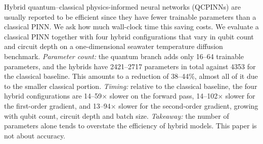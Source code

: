 Hybrid quantum--classical physics-informed neural networks (QCPINNs) are usually reported to be
efficient since they have fewer trainable parameters than a classical PINN. We ask how much
wall-clock time this saving costs. We evaluate a classical PINN together with four hybrid
configurations that vary in qubit count and circuit depth on a one-dimensional seawater
temperature diffusion benchmark.
\emph{Parameter count:} the quantum branch adds only 16--64 trainable parameters, and the
hybrids have 2421--2717 parameters in total against 4353 for the classical baseline. This amounts
to a reduction of 38--44\%, almost all of it due to the smaller classical portion.
\emph{Timing:} relative to the classical baseline, the four hybrid configurations are
14--59$\times$ slower on the forward pass, 14--102$\times$ slower for the first-order gradient,
and 13--94$\times$ slower for the second-order gradient, growing with qubit count, circuit depth
and batch size.
\emph{Takeaway:} the number of parameters alone tends to overstate the efficiency of hybrid
models. This paper is not about accuracy.
